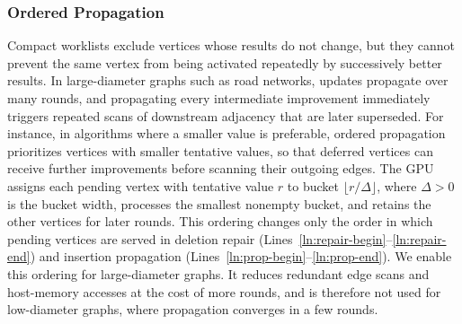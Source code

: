 \subsubsection{Ordered Propagation}
\label{sec:ordered-propagation}
\label{sec:workload-cost}
Compact worklists exclude vertices whose results do not change, but they cannot prevent the same vertex from being activated repeatedly by successively better results. In large-diameter graphs such as road networks, updates propagate over many rounds, and propagating every intermediate improvement immediately triggers repeated scans of downstream adjacency that are later superseded. For instance, in algorithms where a smaller value is preferable, ordered propagation prioritizes vertices with smaller tentative values, so that deferred vertices can receive further improvements before scanning their outgoing edges. The GPU assigns each pending vertex with tentative value $r$ to bucket $\lfloor r/\Delta\rfloor$, where $\Delta>0$ is the bucket width, processes the smallest nonempty bucket, and retains the other vertices for later rounds. This ordering changes only the order in which pending vertices are served in deletion repair (Lines~\ref{ln:repair-begin}--\ref{ln:repair-end}) and insertion propagation (Lines~\ref{ln:prop-begin}--\ref{ln:prop-end}). We enable this ordering for large-diameter graphs. It reduces redundant edge scans and host-memory accesses at the cost of more rounds, and is therefore not used for low-diameter graphs, where propagation converges in a few rounds.
